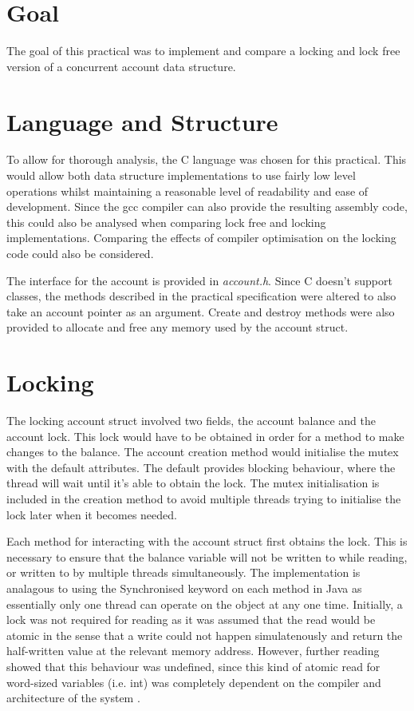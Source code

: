 \documentclass[12pt]{article}
\begin{document}
\part*{Goal}

The goal of this practical was to implement and compare a locking and lock free version of a concurrent account data structure.

\part{Language and Structure}

To allow for thorough analysis, the C language was chosen for this practical. This would allow both data structure implementations to use fairly low level operations whilst maintaining a reasonable level of readability and ease of development. Since the gcc compiler can also provide the resulting assembly code, this could also be analysed when comparing lock free and locking implementations. Comparing the effects of compiler optimisation on the locking code could also be considered. 

The interface for the account is provided in \emph{account.h}. Since C doesn't support classes, the methods described in the practical specification were altered to also take an account pointer as an argument. Create and destroy methods were also provided to allocate and free any memory used by the account struct.

\part{Locking}

The locking account struct involved two fields, the account balance and the account lock. This lock would have to be obtained in order for a method to make changes to the balance. The account creation method would initialise the mutex with the default attributes. The default provides blocking behaviour, where the thread will wait until it's able to obtain the lock. The mutex initialisation is included in the creation method to avoid multiple threads trying to initialise the lock later when it becomes needed.

Each method for interacting with the account struct first obtains the lock. This is necessary to ensure that the balance variable will not be written to while reading, or written to by multiple threads simultaneously. The implementation is analagous to using the Synchronised keyword on each method in Java as essentially only one thread can operate on the object at any one time. Initially, a lock was not required for reading as it was assumed that the read would be atomic in the sense that a write could not happen simulatenously and return the half-written value at the relevant memory address. However, further reading showed that this behaviour was undefined, since this kind of atomic read for word-sized variables (i.e. int) was completely dependent on the compiler and architecture of the system \cite{mutexAtomic}. 
\end{document}
